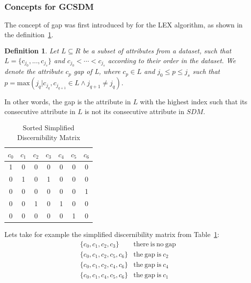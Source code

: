 \documentclass[authoryear,11pt]{elsarticle}
\newtheorem{definition}{Definition}
\begin{document}
\subsubsection{Concepts for GCSDM}

	The concept of gap was first introduced by \cite{Santiesteban03} for the LEX algorithm, as shown in the
	definition~\ref{def:gap}.
	
	\begin{definition}\label{def:gap}
		Let $L \subseteq R$ be a subset of attributes from a dataset, such that $L = \lbrace c_{j_0},...,c_{j_s}
		\rbrace$ and $c_{j_0}<\cdots <c_{j_s}$ according to their order in the dataset. We denote the attribute
		$c_p$ gap of L, where $c_p \in L$ and $j_0 \leq p \leq	j_s$ such that 
		$p=\mathrm{max}(j_q | c_{j_q},c_{j_{q+1}} \in L \wedge j_{q+1} \neq j_q)$.
	\end{definition}
	
	In other words, the gap is the attribute in $L$ with the highest index such that its consecutive attribute in 
	$L$ is not its consecutive attribute in $SDM$.
	
	\begin{table}[!htb]
      \centering
        \caption{Sorted Simplified Discernibility Matrix}
        \begin{tabular}{ccccccc}\label{tab:SDM1}
            $c_0$ & $c_1$ & $c_2$ & $c_3$ & $c_4$ & $c_5$ & $c_6$\\
        		\hline
        		1&0&0&0&0&0&0\\
        		0&1&0&1&0&0&0\\
        		0&0&0&0&0&0&1\\
        		0&0&1&0&1&0&0\\
        		0&0&0&0&0&1&0\\
        \end{tabular} 
	\end{table}
	
	Lets take for example the simplified discernibility matrix from Table~\ref{tab:SDM1}:
	$$\begin{array}{ll}
	\lbrace c_0,c_1,c_2,c_3\rbrace 		& \mathrm{there~is~no~gap}\\
	\lbrace c_0,c_1,c_2,c_5,c_6\rbrace 	& \mathrm{the~gap~is~} c_2\\
	\lbrace c_0,c_1,c_2,c_4,c_6\rbrace 	& \mathrm{the~gap~is~} c_4\\
	\lbrace c_0,c_1,c_4,c_5,c_6\rbrace 	& \mathrm{the~gap~is~} c_1
	\end{array}$$
	
\end{document}
